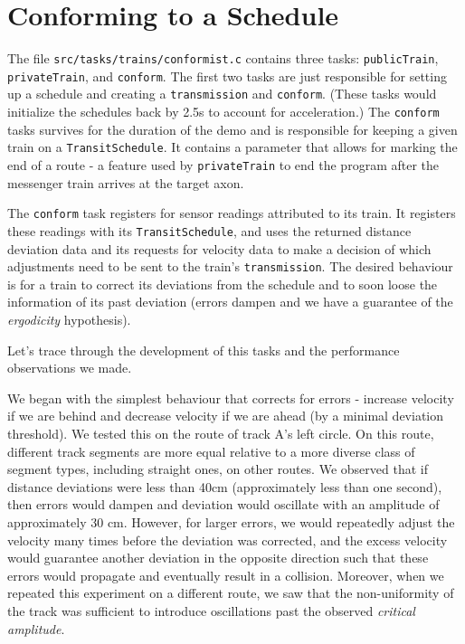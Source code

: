 \documentclass{amsart} \usepackage{amsmath} \usepackage{upgreek}
\newcommand{\x}[1]{\texttt{#1}}
\begin{document}
\section*{Conforming to a Schedule}

The file \x{src/tasks/trains/conformist.c} contains three tasks:
\x{publicTrain}, \x{privateTrain}, and \x{conform}. The first two tasks are just
responsible for setting up a schedule and creating a \x{transmission} and
\x{conform}. (These tasks would initialize the schedules back by 2.5s to account
for acceleration.) The \x{conform} tasks survives for the duration of the demo
and is responsible for keeping a given train on a \x{TransitSchedule}. It
contains a parameter that allows for marking the end of a route - a feature used
by \x{privateTrain} to end the program after the messenger train arrives at the
target axon.

The \x{conform} task registers for sensor readings attributed to its train. It
registers these readings with its \x{TransitSchedule}, and uses the returned
distance deviation data and its requests for velocity data to make a decision of
which adjustments need to be sent to the train's \x{transmission}. The desired
behaviour is for a train to correct its deviations from the schedule and to soon
loose the information of its past deviation (errors dampen and we have a
guarantee of the \textit{ergodicity} hypothesis).

\vspace{0.4cm}

Let's trace through the development of this tasks and the performance
observations we made.

\vspace{0.4cm}

We began with the simplest behaviour that corrects for errors - increase
velocity if we are behind and decrease velocity if we are ahead (by a minimal
deviation threshold). We tested this on the route of track A's left circle.
On this route, different track segments are more equal relative to a more
diverse class of segment types, including straight ones, on other routes. We
observed that if distance deviations were less than 40cm (approximately less
than one second), then errors would dampen and deviation would oscillate with an
amplitude of approximately 30 cm. However, for larger errors, we would
repeatedly adjust the velocity many times before the deviation was corrected,
and the excess velocity would guarantee another deviation in the opposite
direction such that these errors would propagate and eventually result in a
collision. Moreover, when we repeated this experiment on a different route, we
saw that the non-uniformity of the track was sufficient to introduce
oscillations past the observed \textit{critical amplitude}.
\end{document}
